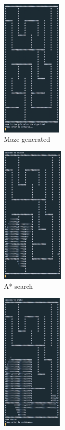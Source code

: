 \documentclass[11pt]{article}
\begin{document}
\begin{figure}[H]
\centering
\begin{subfigure}{0.24\textwidth}
    \includegraphics[height=7cm]{Maze_Generated} 
    \caption{Maze generated}
    \label{fig:subim1}
\end{subfigure}
\begin{subfigure}{0.24\textwidth}
    \includegraphics[height=7cm]{A_Star_Search_Maze}
    \caption{A* search}
    \label{fig:subim2}
\end{subfigure}
\begin{subfigure}{0.24\textwidth}
    \includegraphics[height=7cm]{A_Star_Path_Found_Maze}

\end{subfigure}
\end{figure}
\end{document}
